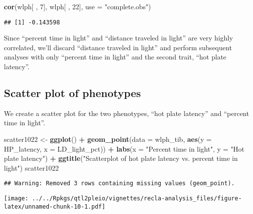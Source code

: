 \documentclass{book}
\newenvironment{Shaded}{\begin{snugshade}}{\end{snugshade}}
\newcommand{\DataTypeTok}[1]{\textcolor[rgb]{0.13,0.29,0.53}{#1}}
\newcommand{\DecValTok}[1]{\textcolor[rgb]{0.00,0.00,0.81}{#1}}
\newcommand{\KeywordTok}[1]{\textcolor[rgb]{0.13,0.29,0.53}{\textbf{#1}}}
\newcommand{\NormalTok}[1]{#1}
\newcommand{\OperatorTok}[1]{\textcolor[rgb]{0.81,0.36,0.00}{\textbf{#1}}}
\newcommand{\StringTok}[1]{\textcolor[rgb]{0.31,0.60,0.02}{#1}}
\begin{document}
\begin{Shaded}
\begin{Highlighting}[]
\KeywordTok{cor}\NormalTok{(wlph[ , }\DecValTok{7}\NormalTok{], wlph[ , }\DecValTok{22}\NormalTok{], }\DataTypeTok{use =} \StringTok{"complete.obs"}\NormalTok{)}
\end{Highlighting}
\end{Shaded}

\begin{verbatim}
## [1] -0.143598
\end{verbatim}

Since ``percent time in light'' and ``distance traveled in light'' are
very highly correlated, we'll discard ``distance traveled in light'' and
perform subsequent analyses with only ``percent time in light'' and the
second trait, ``hot plate latency''.

\hypertarget{scatter-plot-of-phenotypes}{%
\subsection{Scatter plot of
phenotypes}\label{scatter-plot-of-phenotypes}}

We create a scatter plot for the two phenotypes, ``hot plate latency''
and ``percent time in light''.

\begin{Shaded}
\begin{Highlighting}[]
\NormalTok{scatter1022 <-}\StringTok{ }\KeywordTok{ggplot}\NormalTok{() }\OperatorTok{+}\StringTok{ }\KeywordTok{geom_point}\NormalTok{(}\DataTypeTok{data =}\NormalTok{ wlph_tib, }\KeywordTok{aes}\NormalTok{(}\DataTypeTok{y =}\NormalTok{ HP_latency, }\DataTypeTok{x =}\NormalTok{ LD_light_pct)) }\OperatorTok{+}\StringTok{ }\KeywordTok{labs}\NormalTok{(}\DataTypeTok{x =} \StringTok{"Percent time in light"}\NormalTok{, }\DataTypeTok{y =} \StringTok{"Hot plate latency"}\NormalTok{) }\OperatorTok{+}\StringTok{ }\KeywordTok{ggtitle}\NormalTok{(}\StringTok{"Scatterplot of hot plate latency vs. percent time in light"}\NormalTok{)}
\NormalTok{scatter1022}
\end{Highlighting}
\end{Shaded}

\begin{verbatim}
## Warning: Removed 3 rows containing missing values (geom_point).
\end{verbatim}

\texttt{[image: ../../Rpkgs/qtl2pleio/vignettes/recla-analysis\_files/figure-latex/unnamed-chunk-10-1.pdf]}
\end{document}
